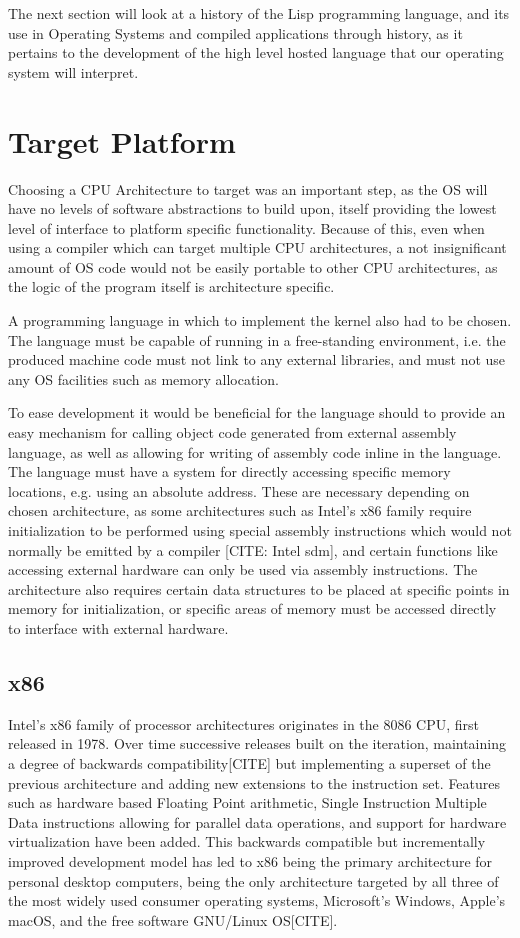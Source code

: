 \documentclass[11pt]{report}
\begin{document}
The next section will look at a history of the Lisp programming language, and its use in Operating Systems and compiled applications through history, as it pertains to the development of the high level hosted language that our operating system will interpret.

\section{Target Platform}
Choosing a CPU Architecture to target was an important step, as the OS will have no levels of software abstractions to build upon, itself providing the lowest level of interface to platform specific functionality. Because of this, even when using a compiler which can target multiple CPU architectures, a not insignificant amount of OS code would not be easily portable to other CPU architectures, as the logic of the program itself is architecture specific.

A programming language in which to implement the kernel also had to be chosen. The language must be capable of running in a free-standing environment, i.e. the produced machine code must not link to any external libraries, and must not use any OS facilities such as memory allocation.

To ease development it would be beneficial for the language should to provide an easy mechanism for calling object code generated from external assembly language, as well as allowing for writing of assembly code inline in the language. The language must have a system for directly accessing specific memory locations, e.g. using an absolute address. These are necessary depending on chosen architecture, as some architectures such as Intel's x86 family require initialization to be performed using special assembly instructions which would not normally be emitted by a compiler [CITE: Intel sdm], and certain functions like accessing external hardware can only be used via assembly instructions. The architecture also requires certain data structures to be placed at specific points in memory for initialization, or specific areas of memory must be accessed directly to interface with external hardware.

\subsection{x86}
Intel's x86 family of processor architectures originates in the 8086 CPU, first released in 1978\cite{intel-hall-of-fame}. Over time successive releases built on the iteration, maintaining a degree of backwards compatibility[CITE] but implementing a superset of the previous architecture and adding new extensions to the instruction set. Features such as hardware based Floating Point arithmetic, Single Instruction Multiple Data instructions allowing for parallel data operations, and support for hardware virtualization have been added. This backwards compatible but incrementally improved development model has led to x86 being the primary architecture for personal desktop computers, being the only architecture targeted by all three of the most widely used consumer operating systems, Microsoft's Windows, Apple's macOS, and the free software GNU/Linux OS[CITE].
\end{document}
